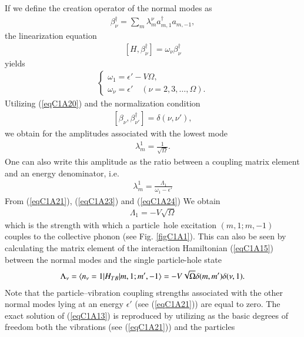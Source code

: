 If we define the creation operator of the normal modes as
 \begin{align}\label{eqC1A19} 
\beta^\dagger_\nu=\sum_m \lambda_m^\nu a_{m,1}^\dagger a_{m,-1},
 \end{align}
the linearization equation
 \begin{align}\label{eqC1A20} 
[H,\beta_\nu^\dagger]=\omega_\nu\beta^\dagger_\nu
 \end{align}
yields
 \begin{align}\label{eqC1A21} 
\left\{\begin{array}{l}
 \omega_1=\epsilon'-V\Omega,\\ 
\omega_\nu=\epsilon'\quad (\nu=2,3,\dots,\Omega).
\end{array} \right.
 \end{align}
Utilizing (\ref{eqC1A20}) and the normalization condition
 \begin{align}\label{eqC1A22} 
[\beta_\nu,\beta^\dagger_{\nu'}]=\delta(\nu,\nu'),
 \end{align}
we obtain for the amplitudes associated with the lowest mode
 \begin{align}\label{eqC1A23} 
\lambda_m^1=\frac{1}{\sqrt{\Omega}}.
 \end{align}
One can also write this amplitude as the ratio between a coupling matrix
element and an energy denominator, i.e.
 \begin{align}\label{eqC1A24} 
\lambda_m^1=\frac{\Lambda_1}{\omega_1-\epsilon'}
 \end{align}
From (\ref{eqC1A21}), (\ref{eqC1A23}) and (\ref{eqC1A24}) We obtain
 \begin{align}\label{eqC1A25} 
\Lambda_1=-V\sqrt{\Omega}
 \end{align}
which is the strength with which a particle~hole excitation $(m, 1; m, -1)$
couples to the collective phonon (see Fig. \ref{figC1A1}). This can also be seen by calculating
the matrix element of the interaction Hamiltonian (\ref{eqC1A15}) between the normal
modes and the single particle-hole state
 \begin{align}\label{eqC1A26} 
\Lambda_\nu=\langle {n_\nu=1|H_{TB}|m,1;m',-1} \rangle=-V\sqrt{\Omega}\delta(m,m')\delta(\nu,1).
 \end{align}
Note that the particle--vibration coupling strengths associated with the other
normal modes lying at an energy $\epsilon'$ (see (\ref{eqC1A21})) are equal to zero. The exact solution of (\ref{eqC1A13}) is reproduced by utilizing
as the basic degrees of freedom both the vibrations (see (\ref{eqC1A21})) and the particles
